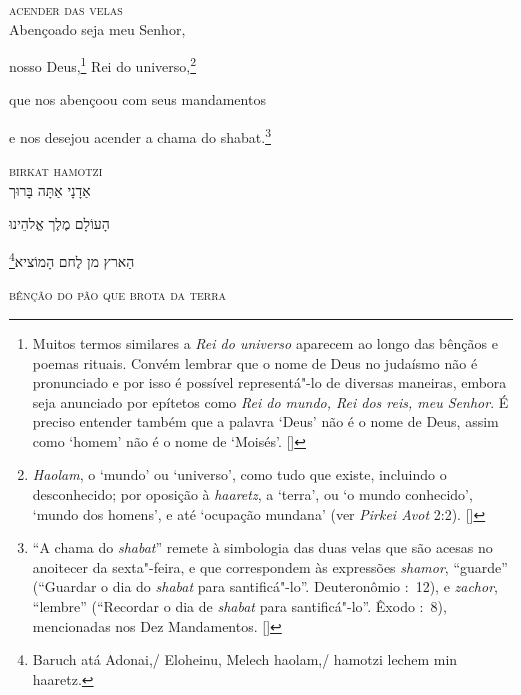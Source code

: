 \textsc{acender das velas}\\[15pt]

Abençoado seja meu Senhor,

nosso Deus,\footnote{
		Muitos termos similares a \textit{Rei do universo} aparecem
		ao longo das bênçãos e poemas rituais. Convém lembrar que o nome de Deus
		no judaísmo não é pronunciado e por isso é possível
		representá"-lo de diversas maneiras, embora seja anunciado por
		epítetos como \textit{Rei do mundo, Rei dos reis, meu Senhor}.
		É preciso entender também que a palavra `Deus' não é o nome de
		Deus, assim como `homem' não é o nome de `Moisés'. []} 
Rei do universo,\footnote{\textit{Haolam}, o `mundo' ou `universo', como tudo
		que existe, incluindo o desconhecido; por oposição à \textit{haaretz},
		a `terra', ou `o mundo conhecido', `mundo dos homens', e até `ocupação
		mundana' (ver \textit{Pirkei Avot} 2:2). []}

que nos abençoou com seus mandamentos

e nos desejou acender a chama do shabat.\footnote{``A chama do \textit{shabat}'' remete à simbologia das duas velas
	que são acesas no anoitecer da sexta"-feira, e que correspondem às
	expressões \emph{shamor}, ``guarde'' (``Guardar o dia do
	\emph{shabat} para santificá"-lo''. Deuteronômio :~12),
	e \emph{zachor}, ``lembre''
	(``Recordar o dia de \emph{shabat} para santificá"-lo''. Êxodo
	:~8), mencionadas nos Dez Mandamentos. []}

\movetoevenpage
\raggedleft


\vspace*{1cm}

\textsc{birkat hamotzi}\\[15pt]

אַדָנָי אַתָּה בָּרוּך

הָעוֹלָם מֶלֶך אֱלהֵינוּ 

\footnote{Baruch atá Adonai,/ Eloheinu, Melech haolam,/ hamotzi lechem min haaretz.}הַארץ מן לֶחם הָמוֹציא

\movetooddpage
\raggedright

\vspace*{1cm}

\textsc{bênção do pão que brota da terra}\\[15pt]

